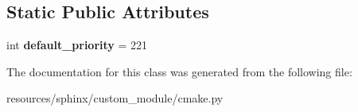 \subsection*{Static Public Attributes}
\begin{DoxyCompactItemize}
\item 
int {\bfseries default\+\_\+priority} = 221\hypertarget{classcmake_1_1CMakeXRefTransform_ab2b872ed2d2e4d99bb3b50ae528c7955}{}\label{classcmake_1_1CMakeXRefTransform_ab2b872ed2d2e4d99bb3b50ae528c7955}

\end{DoxyCompactItemize}


The documentation for this class was generated from the following file\+:\begin{DoxyCompactItemize}
\item 
resources/sphinx/custom\+\_\+module/cmake.\+py\end{DoxyCompactItemize}
